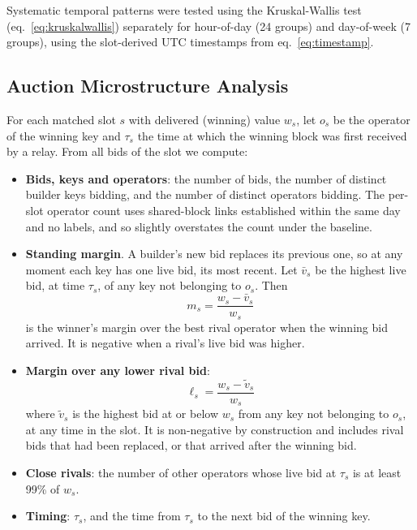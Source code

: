 \documentclass[11pt]{article}
\begin{document}
Systematic temporal patterns were tested using the Kruskal-Wallis test
(eq.~\ref{eq:kruskalwallis}) separately for hour-of-day (24 groups) and
day-of-week (7 groups), using the slot-derived UTC timestamps from
eq.~\ref{eq:timestamp}.

\subsection{Auction Microstructure Analysis}

For each matched slot $s$ with delivered (winning) value $w_s$, let $o_s$ be
the operator of the winning key and $\tau_s$ the time at which the winning
block was first received by a relay. From all bids of the slot we compute:

\begin{itemize}
\item \textbf{Bids, keys and operators}: the number of bids, the number of
distinct builder keys bidding, and the number of distinct operators bidding.
The per-slot operator count uses shared-block links established within the
same day and no labels, and so slightly overstates the count under the baseline.
\item \textbf{Standing margin}. A builder's new bid replaces its previous
one, so at any moment each key has one live bid, its most recent. Let
$\bar{v}_s$ be the highest live bid, at time $\tau_s$, of any key not
belonging to $o_s$. Then
\begin{equation}
m_s = \frac{w_s - \bar{v}_s}{w_s}
\label{eq:margin}
\end{equation}
is the winner's margin over the best rival operator when the winning bid
arrived. It is negative when a rival's live bid was higher.
\item \textbf{Margin over any lower rival bid}:
\begin{equation}
\ell_s = \frac{w_s - \tilde{v}_s}{w_s}
\label{eq:lead}
\end{equation}
where $\tilde{v}_s$ is the highest bid at or below $w_s$ from any key not
belonging to $o_s$, at any time in the slot. It is non-negative by
construction and includes rival bids that had been replaced, or that arrived
after the winning bid.
\item \textbf{Close rivals}: the number of other operators whose live bid at
$\tau_s$ is at least 99\% of $w_s$.
\item \textbf{Timing}: $\tau_s$, and the time from $\tau_s$ to the next bid
of the winning key.
\end{itemize}
\end{document}
